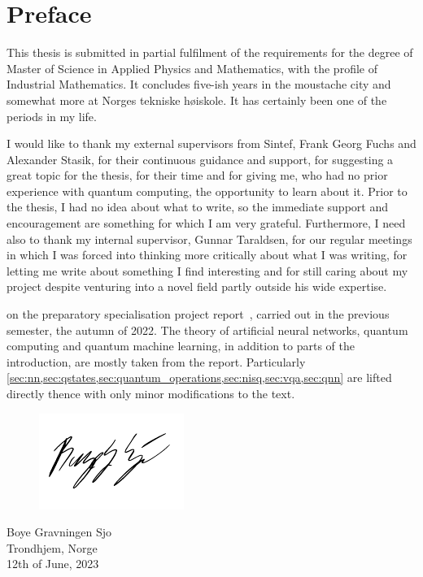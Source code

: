 \chapter{Preface}
This thesis is submitted in partial fulfilment of the requirements for the degree of Master of Science in Applied Physics and Mathematics, with the profile of Industrial Mathematics.
It concludes five-ish years in the moustache city and somewhat more at Norges tekniske høiskole.
It has certainly been one of the periods in my life.

I would like to thank my external supervisors from Sintef, Frank Georg Fuchs and Alexander Stasik, for their continuous guidance and support, for suggesting a great topic for the thesis, for their time and for giving me, who had no prior experience with quantum computing, the opportunity to learn about it.
Prior to the thesis, I had no idea about what to write, so the immediate support and encouragement are something for which I am very grateful.
Furthermore, I need also to thank my internal supervisor, Gunnar Taraldsen, for our regular meetings in which I was forced into thinking more critically about what I was writing, for letting me write about something I find interesting and for still caring about my project despite venturing into a novel field partly outside his wide expertise.

\makebox[\dimexpr\textwidth-\parindent][s]{Note that this thesis is based}
on the preparatory specialisation project report~\autocite{sjo2022}, carried out in the previous semester, the autumn of 2022.
The theory of artificial neural networks, quantum computing and quantum machine learning, in addition to parts of the introduction, are mostly taken from the report.
Particularly \cref{sec:nn,sec:qstates,sec:quantum_operations,sec:nisq,sec:vqa,sec:qnn} are lifted directly thence with only minor modifications to the text.

\vspace*{0.5cm}
\begin{figure}[h]
  \raggedleft
  \includegraphics[width=0.3\linewidth]{blank.pdf}
\end{figure}
\begin{flushright}
  \vspace{-1.3cm}
  Boye Gravningen Sjo \\
  Trondhjem, Norge \\
  12th of June, 2023
\end{flushright}

\cleardoublepage